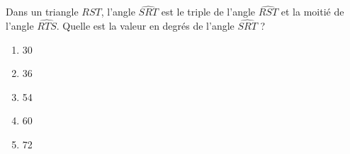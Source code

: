 Dans un triangle $RST$, l'angle $\widehat{SRT}$ est le triple de l'angle $\widehat{RST}$ et la moitié de l'angle $\widehat{RTS}$. Quelle est la valeur en degrés de l'angle $\widehat{SRT}$ ?
\begin{multicols}{5}
  \begin{enumerate}[A/]
  \item 30\degres
  \item 36\degres
  \item 54\degres
  \item 60\degres
  \item 72\degres
  \end{enumerate}
\end{multicols}